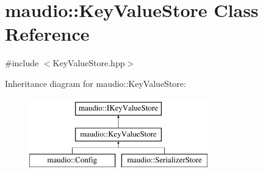 \hypertarget{classmaudio_1_1KeyValueStore}{\section{maudio\-:\-:Key\-Value\-Store Class Reference}
\label{classmaudio_1_1KeyValueStore}
}


{\ttfamily \#include $<$Key\-Value\-Store.\-hpp$>$}

Inheritance diagram for maudio\-:\-:Key\-Value\-Store\-:\begin{figure}[H]
\begin{center}
\leavevmode
\includegraphics[height=3.000000cm]{classmaudio_1_1KeyValueStore}
\end{center}
\end{figure}
